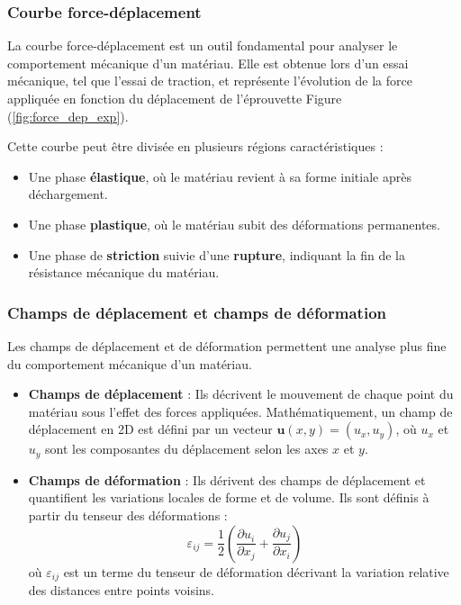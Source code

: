\documentclass[12pt,a4paper]{article}
\begin{document}
\subsubsection{Courbe force-déplacement}
La courbe force-déplacement est un outil fondamental pour analyser le comportement mécanique d’un matériau. Elle est obtenue lors d’un essai mécanique, tel que l’essai de traction, et représente l’évolution de la force appliquée en fonction du déplacement de l’éprouvette Figure (\ref{fig:force_dep_exp}).

Cette courbe peut être divisée en plusieurs régions caractéristiques :
\begin{itemize}
    \item Une phase \textbf{élastique}, où le matériau revient à sa forme initiale après déchargement.
    \item Une phase \textbf{plastique}, où le matériau subit des déformations permanentes.
    \item Une phase de \textbf{striction} suivie d’une \textbf{rupture}, indiquant la fin de la résistance mécanique du matériau.
\end{itemize}

\subsubsection{Champs de déplacement et champs de déformation}
Les champs de déplacement et de déformation permettent une analyse plus fine du comportement mécanique d’un matériau.

\begin{itemize}
    \item \textbf{Champs de déplacement} : Ils décrivent le mouvement de chaque point du matériau sous l’effet des forces appliquées. Mathématiquement, un champ de déplacement en 2D est défini par un vecteur \( \mathbf{u}(x, y) = (u_x, u_y) \), où \( u_x \) et \( u_y \) sont les composantes du déplacement selon les axes \( x \) et \( y \).

    \item \textbf{Champs de déformation} : Ils dérivent des champs de déplacement et quantifient les variations locales de forme et de volume. Ils sont définis à partir du tenseur des déformations :
    \begin{equation}
        \varepsilon_{ij} = \frac{1}{2} \left( \frac{\partial u_i}{\partial x_j} + \frac{\partial u_j}{\partial x_i} \right)
    \end{equation}
    où \( \varepsilon_{ij} \) est un terme du tenseur de déformation décrivant la variation relative des distances entre points voisins.
\end{itemize}
\end{document}
